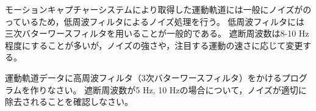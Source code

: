 \documentclass{jsarticle}
\begin{document}
モーションキャプチャーシステムにより取得した運動軌道には一般にノイズがのっているため，低周波フィルタによるノイズ処理を行う。
低周波フィルタには三次バターワースフィルタを用いることが一般的である。
遮断周波数は8-10 Hz程度にすることが多いが，ノイズの強さや，注目する運動の速さに応じて変更する。

運動軌道データに高周波フィルタ（3次バターワースフィルタ）をかけるプログラムを作りなさい。
遮断周波数が5 Hz, 10 Hzの場合について，ノイズが適切に除去されることを確認しなさい。




\end{document}
